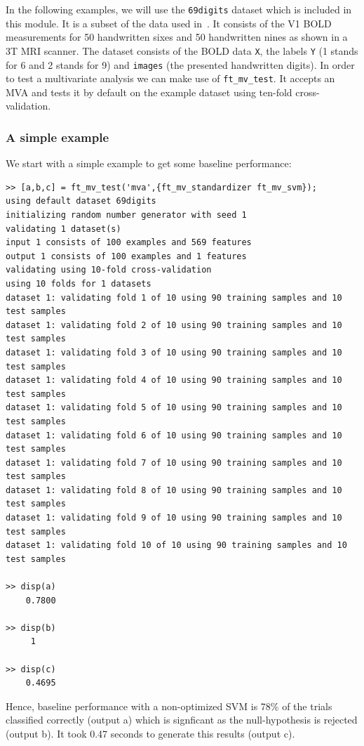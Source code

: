 \documentclass{article}
\renewcommand{\t}[1]{{\tt #1}}
\begin{document}
In the following examples, we will use the \t{69digits} dataset which is included in this module. It is a subset of the data used in~\cite{gerven2010,gerven2010a}. It consists of the V1 BOLD measurements for 50 handwritten sixes and 50 handwritten nines as shown in a 3T MRI scanner. The dataset consists of the BOLD data \t{X}, the labels \t{Y} (1 stands for 6 and 2 stands for 9) and \t{images} (the presented handwritten digits). In order to test a multivariate analysis we can make use of \t{ft\_mv\_test}. It accepts an MVA and tests it by default on the example dataset using ten-fold cross-validation.

\subsubsection*{A simple example}
We start with a simple example to get some baseline performance:
\begin{verbatim}
>> [a,b,c] = ft_mv_test('mva',{ft_mv_standardizer ft_mv_svm});
using default dataset 69digits
initializing random number generator with seed 1
validating 1 dataset(s)
input 1 consists of 100 examples and 569 features
output 1 consists of 100 examples and 1 features
validating using 10-fold cross-validation
using 10 folds for 1 datasets
dataset 1: validating fold 1 of 10 using 90 training samples and 10 test samples
dataset 1: validating fold 2 of 10 using 90 training samples and 10 test samples
dataset 1: validating fold 3 of 10 using 90 training samples and 10 test samples
dataset 1: validating fold 4 of 10 using 90 training samples and 10 test samples
dataset 1: validating fold 5 of 10 using 90 training samples and 10 test samples
dataset 1: validating fold 6 of 10 using 90 training samples and 10 test samples
dataset 1: validating fold 7 of 10 using 90 training samples and 10 test samples
dataset 1: validating fold 8 of 10 using 90 training samples and 10 test samples
dataset 1: validating fold 9 of 10 using 90 training samples and 10 test samples
dataset 1: validating fold 10 of 10 using 90 training samples and 10 test samples

>> disp(a)
    0.7800

>> disp(b)
     1

>> disp(c)
    0.4695    
\end{verbatim}
Hence, baseline performance with a non-optimized SVM is 78\% of the trials classified correctly (output a) which is signficant as the null-hypothesis is rejected (output b). It took 0.47 seconds to generate this results (output c).
\end{document}
